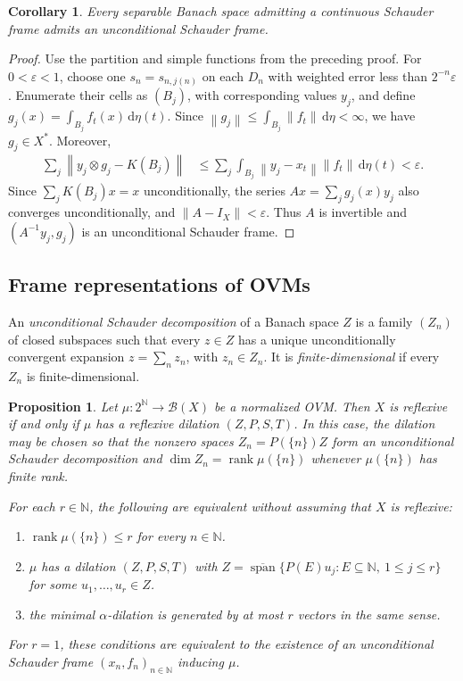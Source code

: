 \documentclass[11pt,leqno]{amsart}
\theoremstyle{compact}
\numberwithin{equation}{section}
\newtheorem{corollary}[theorem]{Corollary}
\newtheorem{proposition}[theorem]{Proposition}
\theoremstyle{compactremark}
\theoremstyle{compact}
\def\cspan{\overline{\operatorname{span}}}
\newcommand{\1}{\mathbbm{1}}
\newcommand{\rmd}{\mathrm{d}}
\newcommand{\N}{\mathbb{N}}
\newcommand{\cB}{\mathcal{B}}
\newcommand{\norm}[1]{\left\|#1\right\|}
\begin{document}
\begin{corollary}\label{cor:frame-discretization}
Every separable Banach space admitting a continuous Schauder frame admits an unconditional Schauder frame.
\end{corollary}

\begin{proof}
Use the partition and simple functions from the preceding proof. For $0<\varepsilon<1$, choose one $s_n=s_{n,j(n)}$ on each $D_n$ with weighted error less than $2^{-n}\varepsilon$. Enumerate their cells as $(B_j)$, with corresponding values $y_j$, and define $g_j(x)=\int_{B_j}f_t(x)\,\rmd\eta(t)$. Since $\norm{g_j}\leq\int_{B_j}\norm{f_t}\,\rmd\eta<\infty$, we have $g_j\in X^*$. Moreover,
\begin{align*}
\sum_j\norm{y_j\otimes g_j-K(B_j)}
&\leq\sum_j\int_{B_j}\norm{y_j-x_t}\norm{f_t}\,\rmd\eta(t)
  <\varepsilon.
\end{align*}
Since $\sum_jK(B_j)x=x$ unconditionally, the series $Ax=\sum_jg_j(x)y_j$ also converges unconditionally, and $\norm{A-I_X}<\varepsilon$. Thus $A$ is invertible and $(A^{-1}y_j,g_j)$ is an unconditional Schauder frame.
\end{proof}

\subsection{Frame representations of OVMs}

\begingroup
An \emph{unconditional Schauder decomposition} of a Banach space $Z$ is a family $(Z_n)$ of closed subspaces such that every $z\in Z$ has a unique unconditionally convergent expansion $z=\sum_nz_n$, with $z_n\in Z_n$. It is \emph{finite-dimensional} if every $Z_n$ is finite-dimensional.

\begin{proposition}\label{prop:discrete-frame-representation}
Let $\mu\colon2^{\N}\to\cB(X)$ be a normalized OVM. Then $X$ is reflexive if and only if $\mu$ has a reflexive dilation $(Z,P,S,T)$. In this case, the dilation may be chosen so that the nonzero spaces $Z_n=P(\{n\})Z$ form an unconditional Schauder decomposition and $\dim Z_n=\operatorname{rank}\mu(\{n\})$ whenever $\mu(\{n\})$ has finite rank.

For each $r\in\N$, the following are equivalent without assuming that $X$ is reflexive:
\begin{enumerate}
\item $\operatorname{rank}\mu(\{n\})\leq r$ for every $n\in\N$.
\item $\mu$ has a dilation $(Z,P,S,T)$ with $ Z=\cspan\{P(E)u_j:E\subseteq\N,\ 1\leq j\leq r\} $ for some $u_1,\ldots,u_r\in Z$.
\item the minimal $\alpha$-dilation is generated by at most $r$ vectors in the same sense.
\end{enumerate}
For $r=1$, these conditions are equivalent to the existence of an unconditional Schauder frame $(x_n,f_n)_{n\in\N}$ inducing $\mu$.
\end{proposition}
\end{document}
